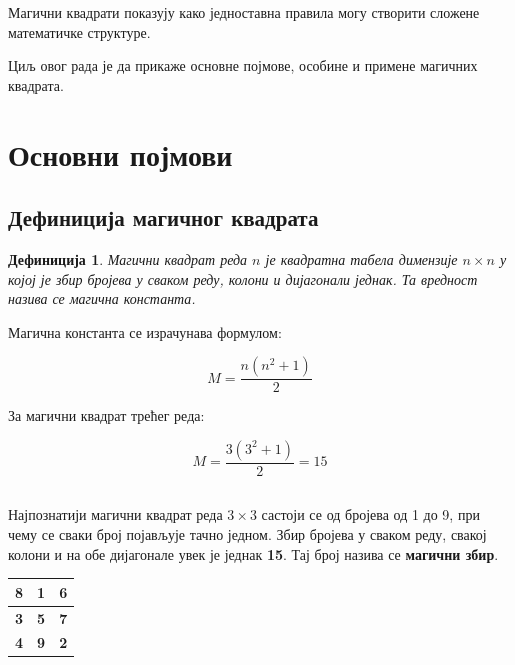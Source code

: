 \documentclass[12pt,a4paper]{article}
\newtheorem{definition}{Дефиниција}
\begin{document}
\textcolor{myblue}{Магични квадрати показују како једноставна правила могу створити
сложене математичке структуре.}


Циљ овог рада је да прикаже основне појмове, особине и примене магичних
квадрата.



\section{Основни појмови}



\subsection{Дефиниција магичног квадрата}



\begin{definition}

Магични квадрат реда $n$ је квадратна табела димензије $n \times n$ у којој је
збир бројева у сваком реду, колони и дијагонали једнак. Та вредност назива се
магична константа.

\end{definition}



Магична константа се израчунава формулом:


\[
M=\frac{n(n^2+1)}{2}
\]


За магични квадрат трећег реда:


\[
M=\frac{3(3^2+1)}{2}=15
\]

\subsection{}

{\color[HTML]{659EC7}
Најпознатији магични квадрат реда \(3 \times 3\) састоји се од бројева од 1 до 9, при чему се сваки број појављује тачно једном. Збир бројева у сваком реду, свакој колони и на обе дијагонале увек је једнак \textbf{15}. Тај број назива се \textbf{магични збир}.
}

\vspace{0.5cm}

\begin{center}
{\color[HTML]{659EC7}
\renewcommand{\arraystretch}{2}
\setlength{\tabcolsep}{18pt}
\begin{tabular}{|c|c|c|}
\hline
\Large\textbf{8} & \Large\textbf{1} & \Large\textbf{6} \\ \hline
\Large\textbf{3} & \Large\textbf{5} & \Large\textbf{7} \\ \hline
\Large\textbf{4} & \Large\textbf{9} & \Large\textbf{2} \\ \hline
\end{tabular}
}
\end{center}
\end{document}
